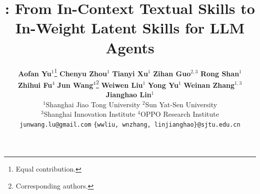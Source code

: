 \documentclass[11pt]{article}
\title{\method{}: From In-Context Textual Skills to In-Weight Latent Skills for LLM Agents}
\author{
  \textbf{Aofan Yu}$^{1}$\thanks{Equal contribution.} \quad
  \textbf{Chenyu Zhou}$^{1}$\footnotemark[1] \quad
  \textbf{Tianyi Xu}$^{1}$ \quad
  \textbf{Zihan Guo}$^{2,3}$ \quad
  \textbf{Rong Shan}$^{1}$ \\
  \textbf{Zhihui Fu}$^{4}$ \quad
  \textbf{Jun Wang}$^{4}$\thanks{Corresponding authors.} \quad
  \textbf{Weiwen Liu}$^{1}$\footnotemark[2] \quad
  \textbf{Yong Yu}$^{1}$ \quad
  \textbf{Weinan Zhang}$^{1,3}$\footnotemark[2] \quad
  \textbf{Jianghao Lin}$^{1}$\footnotemark[2] \\[6pt]
  $^{1}$Shanghai Jiao Tong University \quad
  $^{2}$Sun Yat-Sen University \\
  $^{3}$Shanghai Innovation Institute \quad
  $^{4}$OPPO Research Institute \\[4pt]
  \texttt{junwang.lu@gmail.com} \quad
  \texttt{\{wwliu, wnzhang, linjianghao\}@sjtu.edu.cn}
}
\begin{document}
\maketitle
\begin{abstract}

\end{abstract}












\appendix









\end{document}
